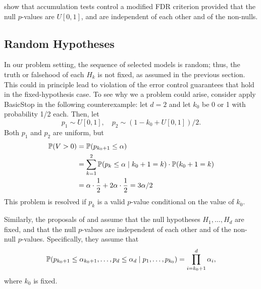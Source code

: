 \documentclass{article}
\begin{document}
\citet{li2015accumulation} show that accumulation tests control a modified FDR criterion provided that the null $p$-values are $U[0,1]$, and are independent of each other and of the non-nulls.

\subsection{Random Hypotheses}

In our problem setting, the sequence of selected models is random; thus, the truth or falsehood of each $H_k$ is not fixed, as assumed in the previous section. This could in principle lead to violation of the error control guarantees that hold in the fixed-hypothesis case.
To see why we a problem could arise, consider apply BasicStop in the following counterexample: let $d=2$ and let $k_0$ be 0 or 1 with probability 1/2 each. Then, let 
\[
p_1 \sim U[0,1], \quad p_2 \sim (1-k_0 + U[0,1])/2.
\]
Both $p_1$ and $p_2$ are uniform, but
\begin{align*}
\P(V>0) &= \P(p_{k_0+1} \leq \alpha)\\ 
&= \sum_{k=1}^2\P(p_k\leq \alpha \mid k_0+1=k)\cdot \P(k_0+1=k)\\
&= \alpha\cdot \frac{1}{2} + 2\alpha \cdot \frac{1}{2} = 3\alpha/2
\end{align*}
This problem is resolved if $p_k$ is a valid $p$-value conditional on the value of $k_0$.

Similarly, the proposals of  \citet{gsell2013sequential} and \citet{li2015accumulation} assume that the null hypotheses $H_{1}, \ldots, H_{d}$ are fixed, and that the null $p$-values are independent of each other and of the non-null $p$-values. Specifically, they assume that
\begin{equation}\label{eq:indepCond_fixed_k0}
\P(p_{k_0+1} \leq \alpha_{k_0+1}, \ldots, p_d \leq \alpha_d
\mid p_1, \ldots, p_{k_0}) = \prod_{i=k_0+1}^d \alpha_i,
\end{equation}
where $k_0$ is fixed. 
\end{document}
